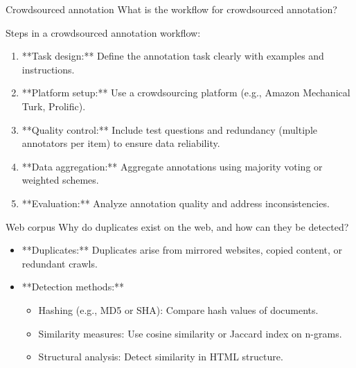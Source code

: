 \documentclass{article}
\begin{document}
\begin{exercise}{Crowdsourced annotation}
  What is the workflow for crowdsourced annotation?

  \begin{solution}
    Steps in a crowdsourced annotation workflow:
    \begin{enumerate}
        \item **Task design:** Define the annotation task clearly with examples and instructions.
        \item **Platform setup:** Use a crowdsourcing platform (e.g., Amazon Mechanical Turk, Prolific).
        \item **Quality control:** Include test questions and redundancy (multiple annotators per item) to ensure data reliability.
        \item **Data aggregation:** Aggregate annotations using majority voting or weighted schemes.
        \item **Evaluation:** Analyze annotation quality and address inconsistencies.
    \end{enumerate}
  \end{solution}
\end{exercise}

\begin{exercise}{Web corpus}
  Why do duplicates exist on the web, and how can they be detected?

  \begin{solution}
    \begin{itemize}
        \item **Duplicates:** Duplicates arise from mirrored websites, copied content, or redundant crawls.
        \item **Detection methods:**
        \begin{itemize}
            \item Hashing (e.g., MD5 or SHA): Compare hash values of documents.
            \item Similarity measures: Use cosine similarity or Jaccard index on n-grams.
            \item Structural analysis: Detect similarity in HTML structure.
        \end{itemize}
    \end{itemize}
  \end{solution}
\end{exercise}
\end{document}
